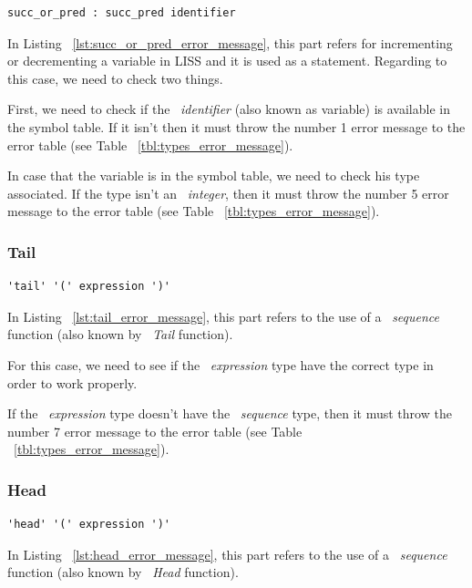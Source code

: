 \documentclass[
  oneside,
  11pt, a4paper,
  footinclude=true,
  headinclude=true,
  cleardoublepage=empty
]{scrbook}
\begin{document}
\begin{lstlisting}[caption={Succ\_or\_pred rule in LISS},label={lst:succ_or_pred_error_message}]
  succ_or_pred : succ_pred identifier
\end{lstlisting}

In Listing ~\ref{lst:succ_or_pred_error_message}, this part refers for incrementing or decrementing a variable in LISS and it is used as a statement.
Regarding to this case, we need to check two things.

First, we need to check if the ~\textit{identifier} (also known as variable) is available in the symbol table. If it isn't then it must throw the number 1 error message to the error table (see Table ~\ref{tbl:types_error_message}).

In case that the variable is in the symbol table, we need to check his type associated. If the type isn't an ~\textit{integer}, then it must throw the number 5 error message to the error table (see Table ~\ref{tbl:types_error_message}).

\subsubsection{Tail}

\begin{lstlisting}[caption={Tail rule in LISS},label={lst:tail_error_message}]
  'tail' '(' expression ')'
\end{lstlisting}

In Listing ~\ref{lst:tail_error_message}, this part refers to the use of a ~\textit{sequence} function (also known by ~\textit{Tail} function).

For this case, we need to see if the ~\textit{expression} type have the correct type in order to work properly.

If the ~\textit{expression} type doesn't have the ~\textit{sequence} type, then it must throw the number 7 error message to the error table (see Table ~\ref{tbl:types_error_message}).

\subsubsection{Head}

\begin{lstlisting}[caption={Head rule in LISS},label={lst:head_error_message}]
  'head' '(' expression ')'
\end{lstlisting}

In Listing ~\ref{lst:head_error_message}, this part refers to the use of a ~\textit{sequence} function (also known by ~\textit{Head} function).
\end{document}
